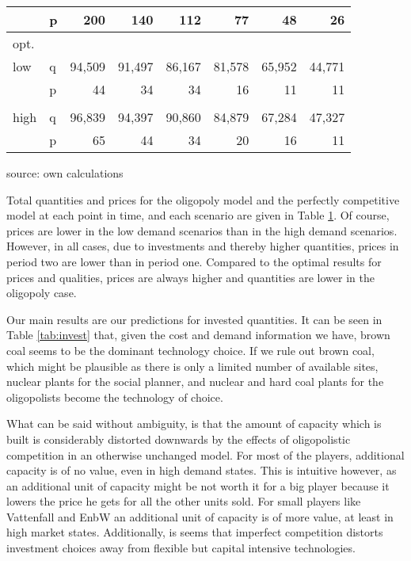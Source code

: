 \begin{table}
\begin{tabular}{llrrrrrr}
           &          p &        200 &        140 &        112 &         77 &         48 &         26 \\
\hline
   opt. &            &            &            &            &            &            &            \\
       low &          q &     94,509 &     91,497 &     86,167 &     81,578 &     65,952 &     44,771 \\
           &          p &         44 &         34 &         34 &         16 &         11 &         11 \\
           &            &            &            &            &            &            &            \\
      high &          q &     96,839 &     94,397 &     90,860 &     84,879 &     67,284 &     47,327 \\
           &          p &         65 &         44 &         34 &         20 &         16 &         11 \\
\hline
\hline
\end{tabular}  

\label{tab:dynquant}
\begin{center}
source: own calculations
\end{center}
\end{table}

Total quantities and prices for the oligopoly model and the perfectly competitive model at each point in time, and each scenario are given in Table \ref{tab:dynquant}. Of course, prices are lower in the low demand scenarios than in the high demand scenarios. However, in all cases, due to investments and thereby higher quantities, prices in period two are lower than in period one.
Compared to the optimal results for prices and qualities, prices are always higher and quantities are lower in the oligopoly case.

Our main results are our predictions for invested quantities. It can be seen in Table \ref{tab:invest} that, given the cost and demand information we have, brown coal seems to be the dominant technology choice. If we rule out brown coal, which might be plausible as there is only a limited number of available sites, nuclear plants for the social planner, and nuclear and hard coal plants for the oligopolists become the technology of choice.

What can be said without ambiguity, is that the amount of capacity which is built is considerably distorted downwards by the effects of oligopolistic competition in an otherwise unchanged model. For most of the players, additional capacity is of no value, even in high demand states. This is intuitive however, as an additional unit of capacity might be not worth it for a big player because it lowers the price he gets for all the other units sold. For small players like Vattenfall and EnbW an additional unit of capacity is of more value, at least in high market states. Additionally, is seems that imperfect competition distorts investment choices away from flexible but capital intensive technologies.


